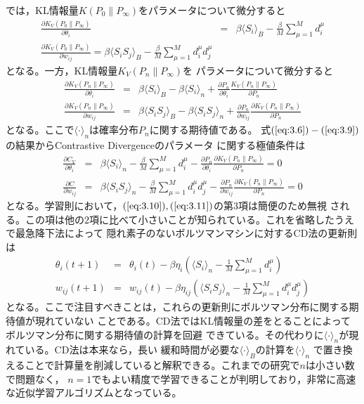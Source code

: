 では，KL情報量$K(P_{0}\parallel P_{\infty})$をパラメータについて微分すると
\begin{eqnarray}
\frac{\partial K_{V}(P_{0}\parallel P_{\infty})}
{\partial\theta_{i}}&=&\beta\langle S_{i}\rangle_{B}
-\frac{\beta}{M}\sum_{\mu=1}^{M}d_{i}^{\mu}\label{eq:3.6}\\
\frac{\partial K_{V}(P_{0}\parallel P_{\infty})}
{\partial w_{ij}}=\beta\langle S_{i}S_{j}\rangle_{B}
-\frac{\beta}{M}\sum_{\mu=1}^{M}d_{i}^{\mu}d_{j}^{\mu}
\label{eq:3.7}
\end{eqnarray}
となる。一方，KL情報量$K_{V}(P_{n}\parallel P_{\infty})$を
パラメータについて微分すると
\begin{eqnarray}
\frac{\partial K_{V}(P_{n}\parallel P_{\infty})}
{\partial\theta_{i}}&=&\beta\langle S_{i}\rangle_{B}
-\beta\langle S_{i}\rangle_{n}
+\frac{\partial P_{n}}{\partial\theta_{i}}
\frac{K_{V}(P_{n}\parallel P_{\infty})}{\partial P_{n}}\label{eq:3.8}\\
\frac{\partial K_{V}(P_{n}\parallel P_{\infty})}{\partial w_{ij}}
&=&\beta\langle S_{i}S_{j}\rangle_{B}-\beta\langle S_{i}S_{j}\rangle_{n}
+\frac{\partial P_{n}}{\partial w_{ij}}
\frac{\partial K_{V}(P_{n}\parallel P_{\infty})}{\partial P_{n}}
\label{eq:3.9}
\end{eqnarray}
となる。ここで$\langle\cdot\rangle_{n}$は確率分布$P_{n}$に関する期待値である。
式$(\ref{eq:3.6})-(\ref{eq:3.9})$の結果からContrastive Divergenceのパラメータ
に関する極値条件は
\begin{eqnarray}
\frac{\partial C_{V}}{\partial\theta_{i}}&=&\beta\langle S_{i}\rangle_{n}
-\frac{\beta}{M}\sum_{\mu=1}^{M}d_{i}^{\mu}-\frac{\partial
P_{n}}{\partial\theta_{i}}\frac{\partial K_{V}(P_{n}\parallel P_{\infty})}
{\partial P_{n}}=0\label{eq:3.10}\\
\frac{\partial C}{\partial w_{ij}}&=&\beta\langle S_{i}S_{j}\rangle_{n}
-\frac{\beta}{M}\sum_{\mu=1}^{M}d_{i}^{\mu}d_{j}^{\mu}
-\frac{\partial P_{n}}{\partial w_{ij}}\frac{\partial
K_{V}(P_{n}\parallel P_{\infty})}{\partial P_{n}}=0\label{eq:3.11}
\end{eqnarray}
となる。学習則において，$(\ref{eq:3.10}),(\ref{eq:3.11})$の第$3$項は簡便のため無視
される。この項は他の$2$項に比べて小さいことが知られている。これを省略したうえで最急降下法によって
隠れ素子のないボルツマンマシンに対するCD法の更新則は
\begin{eqnarray}
\theta_{i}(t+1)&=&\theta_{i}(t)-\beta\eta_{i}
\left(\langle S_{i}\rangle_{n}-\frac{1}{M}\sum_{\mu=1}^{M}d_{i}^{\mu}\right)
\label{eq:3.12}\\
w_{ij}(t+1)&=&w_{ij}(t)-\beta\eta_{ij}\left(\langle S_{i}S_{j}\rangle_{n}
-\frac{1}{M}\sum_{\mu=1}^{M}d_{i}^{\mu}d_{j}^{\mu}\right)
\label{eq:3.13}
\end{eqnarray}
となる。ここで注目すべきことは，これらの更新則にボルツマン分布に関する期待値が現れていない
ことである。CD法ではKL情報量の差をとることによってボルツマン分布に関する期待値の計算を回避
できている。その代わりに$\langle\cdot\rangle_{n}$が現れている。CD法は本来なら，長い
緩和時間が必要な$\langle\cdot\rangle_{B}$の計算を$\langle\cdot\rangle_{n}$
で置き換えることで計算量を削減していると解釈できる。これまでの研究で$n$は小さい数で問題なく，
$n=1$でもよい精度で学習できることが判明しており，非常に高速な近似学習アルゴリズムとなっている。
